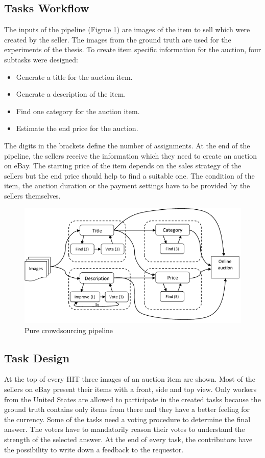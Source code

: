 \subsection{Tasks Workflow}
The inputs of the pipeline (Figrue \ref{purePipeline}) are images of the item to sell which were created by the seller. The images from the ground truth are used for the experiments of the thesis. To create item specific information for the auction, four subtasks were designed: 
\begin{itemize}
	\item Generate a title for the auction item.
	\item Generate a description of the item.
	\item Find one category for the auction item.
	\item Estimate the end price for the auction. 
\end{itemize}
The digits in the brackets define the number of assignments. At the end of the pipeline, the sellers receive the information which they need to create an auction on eBay. The starting price of the item depends on the sales strategy of the sellers but the end price should help to find a suitable one. The condition of the item, the auction duration or the payment settings have to be provided by the sellers themselves.
\begin{figure}[h!]
\centering
\includegraphics[scale=0.8]{images/pipelines/Pure_Pipeline.png}
\caption{Pure crowdsourcing pipeline}
\label{purePipeline}
\end{figure}

\subsection{Task Design}
At the top of every HIT three images of an auction item are shown. Most of the sellers on eBay present their items with a front, side and top view. Only workers from the United States are allowed to participate in the created tasks because the ground truth contains only items from there and they have a better feeling for the currency. Some of the tasks need a voting procedure to determine the final answer. The voters have to mandatorily reason their votes to understand the strength of the selected answer. At the end of every task, the contributors have the possibility to write down a feedback to the requestor.

